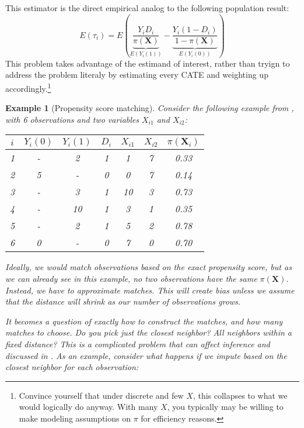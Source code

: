\documentclass{tufte-handout}
\theoremstyle{break}
\newtheorem{exmp}{Example}
\newcommand{\bX}{\mathbf{X}}
\begin{document}
This estimator is the direct empirical analog to the following population result:
\begin{equation*}
  E(\tau_{i}) = E\left(\underbrace{\frac{Y_{i}D_{i}}{\pi(\mathbf{X})}}_{E(Y_{i}(1))} - \underbrace{\frac{Y_{i}(1-D_{i})}{1-\pi(\mathbf{X})}}_{E(Y_{i}(0))}\right)
\end{equation*}
This problem takes advantage of the estimand of interest, rather than tryign to address the problem literaly by estimating every CATE and weighting up accordingly.\footnote{Convince yourself that under discrete and few $X$, this collapses to what we would logically do anyway. With many $X$, you typically may be willing to make modeling assumptions on $\pi$ for efficiency reasons.}


\begin{boxD}
    \begin{exmp}[Propensity score matching]
        \label{example:aronow_matching}
        Consider the following example from \citet{aronow2019foundations}, with 6 observations and two variables $X_{i1}$ and $X_{i2}$:

        \centering
\begin{tabular}{ccccccc}
    \toprule
    $i$ & $Y_{i}(0)$ & $Y_{i}(1)$ & $D_{i}$ & $X_{i1}$ & $X_{i2}$ & $\pi(\mathbf{X}_{i})$\\
    \midrule
    1 & - & 2 & 1 & 1 & 7 & 0.33\\
    2 & 5 & - & 0 & 0 & 7 & 0.14\\    
    3 & - & 3 & 1 & 10 & 3 & 0.73\\
    4 & - & 10 & 1 & 3 & 1 & 0.35\\
    5 & - & 2 & 1 & 5 & 2 & 0.78\\
    6 & 0 & - & 0 & 7 & 0 & 0.70\\
    \bottomrule
  \end{tabular}

  \raggedright
  \hspace{10pt}Ideally, we would match observations based on the exact propensity score, but as we can already see in this example, no two observations have the same $\pi(\bX)$. Instead, we have to approximate matches. This will create bias unless we assume that the distance will shrink as our number of observations grows. 

  \hspace{10pt}It becomes a question of exactly how to construct the matches, and how many matches to choose. Do you pick just the closest neighbor? All neighbors within a fixed distance? This is a complicated problem that can affect inference and discussed in \citet{abadie2008failure}. As an example, consider what happens if we impute based on the closest neighbor for each observation: 


\end{exmp}
\end{boxD}
\end{document}
